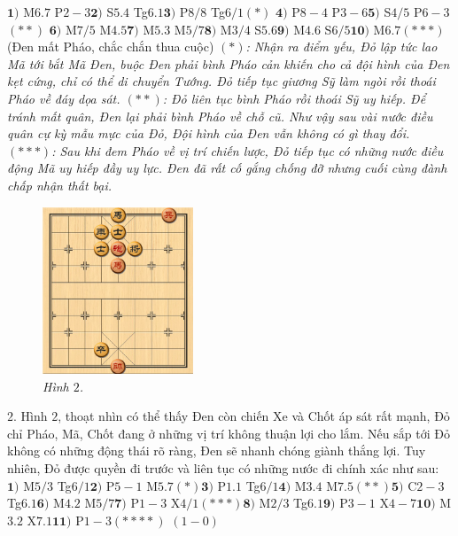 \begin{multicols}{2}
	\vskip 0.1cm
	$\pmb{1)}$ M$6.7$ P$2-3$\quad  $\pmb{2)}$ S$5.4$ Tg$6.1$\quad $\pmb{3)}$ P$8/8$ Tg$6/1$$(*)$ \quad$\pmb{4)}$ P$8-4$ P$3-6$\quad  $\pmb{5)}$ S$4/5$ P$6-3$$(**)$ \quad$\pmb{6)}$ M$7/5$ M$4.5$\quad $\pmb{7)}$ M$5.3$ M$5/7$\quad  $\pmb{8)}$ M$3/4$ S$5.6$\quad $\pmb{9)}$ M$4.6$ S$6/5$\quad $\pmb{10)}$ M$6.7$$(***)$ (Đen mất Pháo, chắc chắn thua cuộc)
	\vskip 0.1cm
	\textit{$(*)$: Nhận ra điểm yếu, Đỏ lập tức lao Mã tới bắt Mã Đen, buộc Đen phải bình Pháo cản khiến cho cả đội hình của Đen kẹt cứng, chỉ có thể di chuyển Tướng. Đỏ tiếp tục giương Sỹ làm ngòi rồi thoái Pháo về đáy dọa sát.
	\vskip 0.1cm
	$(**)$: Đỏ liên tục bình Pháo rồi thoái Sỹ uy hiếp. Để tránh mất quân, Đen lại phải bình Pháo về chỗ cũ. Như vậy sau vài nước điều quân cự kỳ mẫu mực của Đỏ, Đội hình của Đen vẫn không có gì thay đổi.
	\vskip 0.1cm
	$(***)$: Sau khi đem Pháo về vị trí chiến lược, Đỏ tiếp tục có những nước điều động Mã uy hiếp đầy uy lực. Đen đã rất cố gắng chống đỡ nhưng cuối cùng đành chấp nhận thất bại.}
	\begin{figure}[H]
		\vspace*{-5pt}
		\centering
		\captionsetup{labelformat= empty, justification=centering}
		\includegraphics[width= 0.4\textwidth]{2}
		\caption{\small\textit{\color{gocco}Hình $2$.}}
		\vspace*{-10pt}
	\end{figure}
	$2.$ Hình $2$, thoạt nhìn có thể thấy Đen còn chiến Xe và Chốt áp sát rất mạnh, Đỏ chỉ Pháo, Mã, Chốt đang ở những vị trí không thuận lợi cho lắm. Nếu sắp tới Đỏ không có những động thái rõ ràng, Đen sẽ nhanh chóng giành thắng lợi. Tuy nhiên, Đỏ được quyền đi trước và liên tục có những nước đi chính xác như sau:
	\vskip 0.1cm
	$\pmb{1)}$	M$5/3$ Tg$6/1$\quad $\pmb{2)}$ P$5-1$ M$5.7$$(*)$\quad  $\pmb{3)}$ P$1.1$ Tg$6/1$\quad $\pmb{4)}$ M$3.4$  M$7.5$$(**)$\quad  $\pmb{5)}$ C$2-3$ Tg$6.1$\quad $\pmb{6)}$ M$4.2$ M$5/7$\quad $\pmb{7)}$ P$1-3$ X$4/1$$(***)$\quad $\pmb{8)}$ M$2/3$ Tg$6.1$\quad $\pmb{9)}$ P$3-1$ X$4-7$\quad $\pmb{10)}$ M$3.2$ X$7.1$\quad $\pmb{11)}$ P$1-3$$(****)$ $(1-0)$
$$
\end{multicols}
